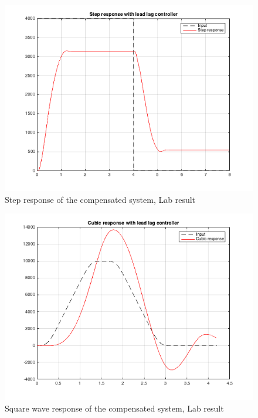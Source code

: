 \documentclass[a4paper, 12pt]{article}
\begin{document}
\begin{figure}[!htbp]
\centering
\includegraphics[scale = 0.6]{LabStepResponseLeadLag}
\caption{Step response of the compensated system, Lab result}
\label{LabStepResponseLeadLag}
\end{figure}

\begin{figure}[!htbp]
\centering
\includegraphics[scale = 0.6]{LabCubicResponseLeadLag}
\caption{Square wave response of the compensated system, Lab result}
\label{LabCubicResponseLeadLag}
\end{figure}
\end{document}
